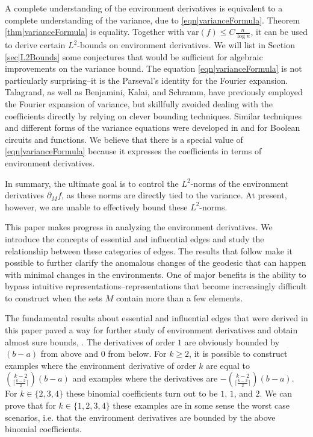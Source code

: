 \documentclass[reqno]{amsart}
\begin{document}
A complete understanding of the environment derivatives is equivalent to a complete understanding of the variance, due to \eqref{eqn|varianceFormula}. 
Theorem \ref{thm|varianceFormula} is equality. Together with 
$\text{var}(f)\leq C\frac n{\log n}$, 
 it can be used to derive certain $L^2$-bounds on environment derivatives. 
We will list in 
Section \ref{sec|L2Bounds} some conjectures that would be sufficient for algebraic improvements on the variance bound.  
The equation \eqref{eqn|varianceFormula} is not particularly surprising--it is the Parseval’s identity for the Fourier expansion. 
Talagrand, as well as Benjamini, Kalai, and Schramm, have previously employed the Fourier expansion of variance, but skillfully avoided dealing with the coefficients directly by relying on 
clever bounding techniques. Similar techniques 
and different forms of the variance equations were developed in \cite{Tal2017} and \cite{Przybylowski2024} for Boolean circuits and functions.
We believe that there is a special value of 
\eqref{eqn|varianceFormula} because it expresses the coefficients in terms of environment derivatives.   
 
In summary, the ultimate goal is to control the $L^2$-norms of the environment derivatives $\partial_M f$, as these norms are directly tied to the variance. At present, however, we are unable 
to effectively bound these $L^2$-norms. 

This paper makes progress in analyzing the environment derivatives. We introduce the concepts of essential and influential edges and study the relationship between these categories of edges. The results that follow make it possible to further clarify the anomalous changes of the geodesic that can happen with minimal changes in the environments. One of major benefits is the ability to
bypass intuitive representations--representations that become increasingly difficult to construct when the sets 
$M$ contain more than a few elements.

The fundamental results about essential and influential edges that were derived in this paper paved a way for further study of environment derivatives and obtain almost sure bounds, \cite{SecondPaper2026}. The derivatives of order $1$ are obviously bounded by $(b-a)$ from above and $0$ from below.
For $k\geq 2$, it is possible to construct examples where the environment derivative of order $k$ are equal to $\binom{k-2}{\lceil\frac{k-2}2\rceil}(b-a)$ and examples where the derivatives are 
$-\binom{k-2}{\lceil\frac{k-2}2\rceil}(b-a)$. 
For $k\in\{2,3,4\}$ these binomial coefficients turn out to be $1$, $1$, and $2$. 
We can prove that for $k\in\{1,2,3,4\}$ these examples are in some sense the worst case scenarios, i.e. that the environment derivatives are bounded by the above binomial coefficients.
\end{document}
